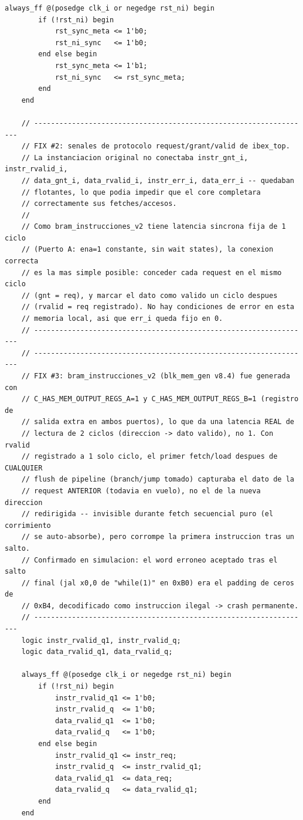 \begin{lstlisting}[style=verilogstyle, basicstyle=\ttfamily\footnotesize, caption={Codigo fuente del subsistema \texttt{ibex\_bram\_subsystem.sv}}, label={code:ibex_bram_subsystem}]
    always_ff @(posedge clk_i or negedge rst_ni) begin
        if (!rst_ni) begin
            rst_sync_meta <= 1'b0;
            rst_ni_sync   <= 1'b0;
        end else begin
            rst_sync_meta <= 1'b1;
            rst_ni_sync   <= rst_sync_meta;
        end
    end

    // ------------------------------------------------------------------
    // FIX #2: senales de protocolo request/grant/valid de ibex_top.
    // La instanciacion original no conectaba instr_gnt_i, instr_rvalid_i,
    // data_gnt_i, data_rvalid_i, instr_err_i, data_err_i -- quedaban
    // flotantes, lo que podia impedir que el core completara
    // correctamente sus fetches/accesos.
    //
    // Como bram_instrucciones_v2 tiene latencia sincrona fija de 1 ciclo
    // (Puerto A: ena=1 constante, sin wait states), la conexion correcta
    // es la mas simple posible: conceder cada request en el mismo ciclo
    // (gnt = req), y marcar el dato como valido un ciclo despues
    // (rvalid = req registrado). No hay condiciones de error en esta
    // memoria local, asi que err_i queda fijo en 0.
    // ------------------------------------------------------------------
    // ------------------------------------------------------------------
    // FIX #3: bram_instrucciones_v2 (blk_mem_gen v8.4) fue generada con
    // C_HAS_MEM_OUTPUT_REGS_A=1 y C_HAS_MEM_OUTPUT_REGS_B=1 (registro de
    // salida extra en ambos puertos), lo que da una latencia REAL de
    // lectura de 2 ciclos (direccion -> dato valido), no 1. Con rvalid
    // registrado a 1 solo ciclo, el primer fetch/load despues de CUALQUIER
    // flush de pipeline (branch/jump tomado) capturaba el dato de la
    // request ANTERIOR (todavia en vuelo), no el de la nueva direccion
    // redirigida -- invisible durante fetch secuencial puro (el corrimiento
    // se auto-absorbe), pero corrompe la primera instruccion tras un salto.
    // Confirmado en simulacion: el word erroneo aceptado tras el salto
    // final (jal x0,0 de "while(1)" en 0xB0) era el padding de ceros de
    // 0xB4, decodificado como instruccion ilegal -> crash permanente.
    // ------------------------------------------------------------------
    logic instr_rvalid_q1, instr_rvalid_q;
    logic data_rvalid_q1, data_rvalid_q;

    always_ff @(posedge clk_i or negedge rst_ni) begin
        if (!rst_ni) begin
            instr_rvalid_q1 <= 1'b0;
            instr_rvalid_q  <= 1'b0;
            data_rvalid_q1  <= 1'b0;
            data_rvalid_q   <= 1'b0;
        end else begin
            instr_rvalid_q1 <= instr_req;
            instr_rvalid_q  <= instr_rvalid_q1;
            data_rvalid_q1  <= data_req;
            data_rvalid_q   <= data_rvalid_q1;
        end
    end


\end{lstlisting}

